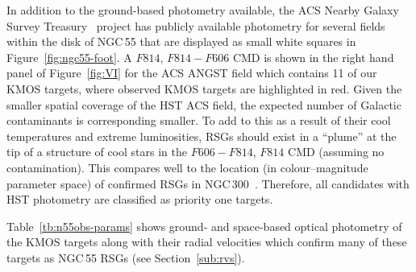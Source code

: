 In addition to the ground-based photometry available, the ACS Nearby Galaxy Survey Treasury~\citep[ANGST][]{2009ApJS..183...67D} project has publicly available photometry for several fields within the disk of NGC\,55 that are displayed as small white squares in Figure~\ref{fig:ngc55-foot}.
A $F814$, $F814-F606$ CMD is shown in the right hand panel of Figure~\ref{fig:VI} for the ACS ANGST field which contains 11 of our KMOS targets, where observed KMOS targets are highlighted in red.
Given the smaller spatial coverage of the HST ACS field, the expected number of Galactic contaminants is corresponding smaller.
To add to this as a result of their cool temperatures and extreme luminosities, RSGs should exist in a ``plume'' at the tip of a structure of cool stars in the $F606-F814$, $F814$ CMD (assuming no contamination).
This compares well to the location (in colour--magnitude parameter space) of confirmed RSGs in NGC\,300~\citep{2015ApJ...805..182G}.
Therefore, all candidates with HST photometry are classified as priority one targets.






Table~\ref{tb:n55obs-params} shows ground- and space-based optical photometry of the KMOS targets along with their radial velocities which confirm many of these targets as NGC\,55 RSGs
(see Section~\ref{sub:rvs}).



